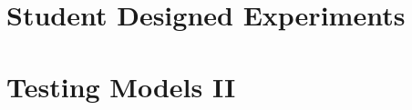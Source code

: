 \documentclass{book}
\begin{document}
       
		
	
	
		
		
		
	


\part{Student Designed Experiments}

		

\part{Testing Models II}

        
        			
			
\end{document}
